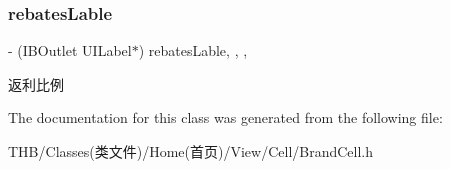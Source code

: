 \subsubsection{\texorpdfstring{rebates\+Lable}{rebatesLable}}
{\footnotesize\ttfamily -\/ (I\+B\+Outlet U\+I\+Label$\ast$) rebates\+Lable\hspace{0.3cm}{\ttfamily [read]}, {\ttfamily [write]}, {\ttfamily [nonatomic]}, {\ttfamily [weak]}}

返利比例 

The documentation for this class was generated from the following file\+:\begin{DoxyCompactItemize}
\item 
T\+H\+B/\+Classes(类文件)/\+Home(首页)/\+View/\+Cell/Brand\+Cell.\+h\end{DoxyCompactItemize}
